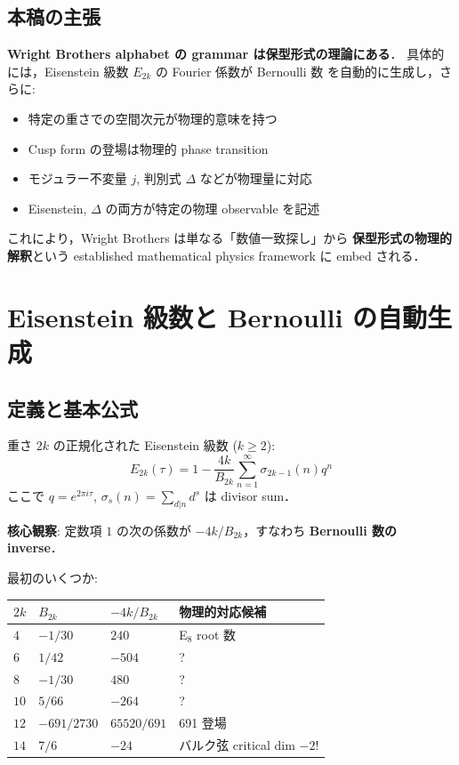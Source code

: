 \documentclass[11pt,a4paper]{article}
\begin{document}
\subsection{本稿の主張}

\textbf{Wright Brothers alphabet の grammar は保型形式の理論にある}．
具体的には，Eisenstein 級数 $E_{2k}$ の Fourier 係数が Bernoulli 数
を自動的に生成し，さらに:
\begin{itemize}
\item 特定の重さでの空間次元が物理的意味を持つ
\item Cusp form の登場は物理的 phase transition
\item モジュラー不変量 $j$, 判別式 $\Delta$ などが物理量に対応
\item Eisenstein, $\Delta$ の両方が特定の物理 observable を記述
\end{itemize}

これにより，Wright Brothers は単なる「数値一致探し」から
\textbf{保型形式の物理的解釈}という established mathematical physics
framework に embed される．

\section{Eisenstein 級数と Bernoulli の自動生成}

\subsection{定義と基本公式}

重さ $2k$ の正規化された Eisenstein 級数 ($k \geq 2$):
\begin{equation}
E_{2k}(\tau) = 1 - \frac{4k}{B_{2k}}\sum_{n=1}^\infty \sigma_{2k-1}(n) q^n
\end{equation}
ここで $q = e^{2\pi i \tau}$, $\sigma_s(n) = \sum_{d|n} d^s$ は divisor
sum．

\textbf{核心観察}: 定数項 $1$ の次の係数が $-4k/B_{2k}$，すなわち
\textbf{Bernoulli 数の inverse}．

最初のいくつか:
\begin{center}
\begin{tabular}{llll}
\toprule
$2k$ & $B_{2k}$ & $-4k/B_{2k}$ & 物理的対応候補\\
\midrule
$4$  & $-1/30$ & $240$ & E$_8$ root 数~\cite{Serre1973}\\
$6$  & $1/42$  & $-504$ & ?\\
$8$  & $-1/30$ & $480$ & ?\\
$10$ & $5/66$  & $-264$ & ?\\
$12$ & $-691/2730$ & $65520/691$ & 691 登場\\
$14$ & $7/6$   & $-24$ & バルク弦 critical dim $- 2$!\\
\bottomrule
\end{tabular}
\end{center}
\end{document}
